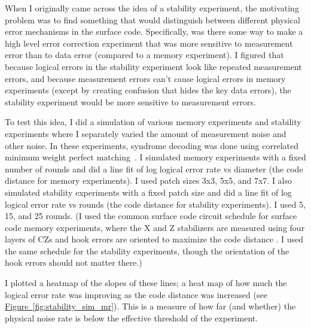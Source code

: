 \documentclass[onecolumn,unpublished,a4paper]{quantumarticle}
\theoremstyle{definition}
\theoremstyle{definition}
\theoremstyle{definition}
\newcommand{\fig}[1]{\hyperref[fig:#1]{Figure~\ref*{fig:#1}}}
\begin{document}
When I originally came across the idea of a stability experiment, the motivating problem was to find something that would distinguish between different physical error mechanisms in the surface code.
Specifically, was there some way to make a high level error correction experiment that was more sensitive to measurement error than to data error (compared to a memory experiment).
I figured that because logical errors in the stability experiment look like repeated measurement errors, and because measurement errors can't cause logical errors in memory experiments (except by creating confusion that hides the key data errors), the stability experiment would be more sensitive to measurement errors.

To test this idea, I did a simulation of various memory experiments and stability experiments where I separately varied the amount of measurement noise and other noise.
In these experiments, syndrome decoding was done using correlated minimum weight perfect matching~\cite{fowler2013optimal}.
I simulated memory experiments with a fixed number of rounds and did a line fit of log logical error rate vs diameter (the code distance for memory experiments).
I used patch sizes 3x3, 5x5, and 7x7.
I also simulated stability experiments with a fixed patch size and did a line fit of log logical error rate vs rounds (the code distance for stability experiments).
I used 5, 15, and 25 rounds.
(I used the common surface code circuit schedule for surface code memory experiments, where the X and Z stabilizers are measured using four layers of CZs and hook errors are oriented to maximize the code distance \cite{horsman2012latticesurgery}.
I used the same schedule for the stability experiments, though the orientation of the hook errors should not matter there.)

I plotted a heatmap of the slopes of these lines; a heat map of how much the logical error rate was improving as the code distance was increased (see \fig{stability_sim_mr}).
This is a measure of how far (and whether) the physical noise rate is below the effective threshold of the experiment.
\end{document}
